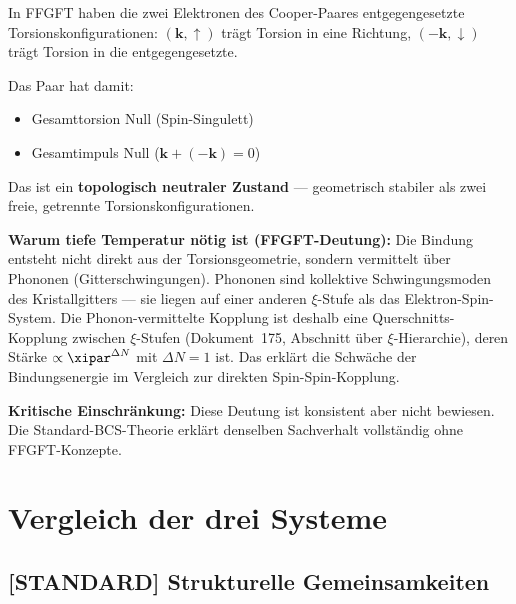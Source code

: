 \begin{foundation}
In FFGFT haben die zwei Elektronen des Cooper-Paares
entgegengesetzte Torsionskonfigurationen:
$(\mathbf{k}, \uparrow)$ trägt Torsion in eine Richtung,
$(-\mathbf{k}, \downarrow)$ trägt Torsion in die entgegengesetzte.

Das Paar hat damit:
\begin{itemize}
  \item Gesamttorsion Null (Spin-Singulett)
  \item Gesamtimpuls Null ($\mathbf{k} + (-\mathbf{k}) = 0$)
\end{itemize}

Das ist ein \textbf{topologisch neutraler Zustand} ---
geometrisch stabiler als zwei freie, getrennte Torsionskonfigurationen.

\textbf{Warum tiefe Temperatur nötig ist (FFGFT-Deutung):}
Die Bindung entsteht nicht direkt aus der Torsionsgeometrie,
sondern vermittelt über Phononen (Gitterschwingungen).
Phononen sind kollektive Schwingungsmoden des Kristallgitters ---
sie liegen auf einer anderen $\xi$-Stufe als das Elektron-Spin-System.
Die Phonon-vermittelte Kopplung ist deshalb eine
Querschnitts-Kopplung zwischen $\xi$-Stufen
(Dokument~175, Abschnitt über $\xi$-Hierarchie),
deren Stärke $\propto \xipar^{\Delta N}$ mit $\Delta N = 1$ ist.
Das erklärt die Schwäche der Bindungsenergie
im Vergleich zur direkten Spin-Spin-Kopplung.

\textbf{Kritische Einschränkung:}
Diese Deutung ist konsistent aber nicht bewiesen.
Die Standard-BCS-Theorie erklärt denselben Sachverhalt
vollständig ohne FFGFT-Konzepte.
\end{foundation}

\section{Vergleich der drei Systeme}
\label{sec:vergleich}

\subsection{[STANDARD] Strukturelle Gemeinsamkeiten}

